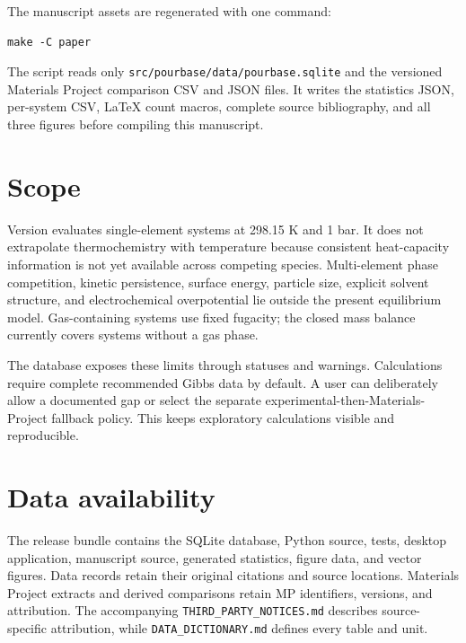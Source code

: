 \documentclass[10pt,twocolumn]{article}
\begin{document}
The manuscript assets are regenerated with one command:

\begin{verbatim}
make -C paper
\end{verbatim}

The script reads only \texttt{src/pourbase/data/pourbase.sqlite} and the versioned Materials Project comparison
CSV and JSON files. It writes the statistics JSON, per-system CSV, LaTeX count macros, complete
source bibliography, and all three figures before compiling this manuscript.

\section{Scope}

Version \DatasetVersion{} evaluates single-element systems at 298.15 K and 1 bar. It does not
extrapolate thermochemistry with temperature because consistent heat-capacity information is not
yet available across competing species. Multi-element phase competition, kinetic persistence,
surface energy, particle size, explicit solvent structure, and electrochemical overpotential lie
outside the present equilibrium model. Gas-containing systems use fixed fugacity; the closed mass
balance currently covers systems without a gas phase.

The database exposes these limits through statuses and warnings. Calculations require complete
recommended Gibbs data by default. A user can deliberately allow a documented gap or select the
separate experimental-then-Materials-Project fallback policy. This keeps exploratory calculations
visible and reproducible.

\section{Data availability}

The release bundle contains the SQLite database, Python source, tests, desktop application, manuscript source, generated statistics, figure data, and vector figures. Data
records retain their original citations and source locations. Materials Project extracts and
derived comparisons retain MP identifiers, versions, and attribution. The accompanying
\texttt{THIRD\_PARTY\_NOTICES.md} describes source-specific attribution, while
\texttt{DATA\_DICTIONARY.md} defines every table and unit.


\end{document}
